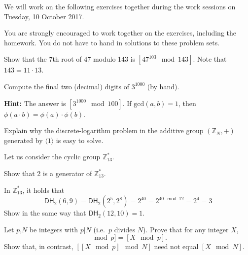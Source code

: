 \documentclass[a4paper,10pt,landscape,twocolumn]{scrartcl}
\newcommand\worksession{Tuesday, 10 October 2017}
\begin{document}
\problems

{\sffamily\noindent
We will work on the following exercises together during the work sessions on \worksession.

You are strongly encouraged to work together on the exercises, including the homework. You do not have to hand in solutions to these problem sets.}


\begin{exercise}
Show that the 7th root of 47 modulo 143 is $[47^{103} \mod 143]$. Note that $143=11\cdot 13$.
\end{exercise}

\begin{exercise}
Compute the final two (decimal) digits of $3^{1000}$ (by hand).

\textbf{Hint:} The answer is $[3^{1000} \mod 100]$. If $\text{gcd}(a,b)=1$, then $\phi(a\cdot b)=\phi(a)\cdot\phi(b)$.
\end{exercise}


\begin{exercise}
Explain why the discrete-logarithm problem in the additive group $(\mathbb{Z}_N, +)$ generated by $\langle 1\rangle$ is easy to solve.
\end{exercise}

\begin{exercise}
Let us consider the cyclic group $\mathbb{Z}_{13}^*$.
\begin{subex}
Show that 2 is a generator of $\mathbb{Z}_{13}^*$.
\end{subex}

\begin{subex}
In $\mathbb{Z}_{13}^*$, it holds that 
\[
\mathsf{DH}_2(6,9) = \mathsf{DH}_2(2^5, 2^8) = 2^{40} = 2^{40 \mod 12} = 2^4 = 3
\]
Show in the same way that $\mathsf{DH}_2(12,10)=1$.
\end{subex}
\end{exercise}


\begin{exercise}
Let $p$,$N$ be integers with $p|N$ (i.e.\ $p$ divides $N$). Prove that for any integer $X$,
\begin{equation*}
[[X \mod N]\mod p]=[X \mod p].
\end{equation*}
Show that, in contrast, $[[X \mod p]\mod N]$ need not equal $[X\mod N]$.
\end{exercise}
\end{document}
